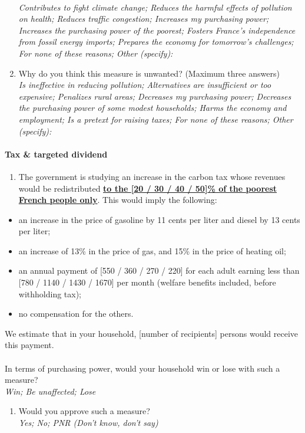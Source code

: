 \documentclass[12pt]{article} %
\begin{document}
\begin{appendices}
\begin{enumerate}[resume,leftmargin=*]
\emph{}\\
\emph{Contributes to fight climate change; Reduces the harmful 
effects of pollution on health; Reduces traffic congestion; Increases
my purchasing power; Increases the purchasing power of the poorest;
Fosters France's independence from fossil energy imports; Prepares
the economy for tomorrow's challenges; For none of these reasons;
Other (specify): }
\item Why do you think this measure is unwanted? (Maximum three answers)
\emph{}\\
\emph{Is ineffective in reducing pollution; Alternatives are insufficient
or too expensive; Penalizes rural areas; Decreases my purchasing power;
Decreases the purchasing power of some modest households; Harms the
economy and employment; Is a pretext for raising taxes; For none of
these reasons; Other (specify):} 
\end{enumerate}

\paragraph{Tax \& targeted dividend}
\begin{enumerate}[resume,leftmargin=*]
\item The government is studying an increase in the carbon tax whose revenues
would be redistributed \textbf{\underline{to the {[}20 / 30 / 40 /
50{]}\% of the poorest French people only}}. This would imply the following: 
\end{enumerate}
\begin{itemize}
\item an increase in the price of gasoline by 11 cents per liter and diesel
by 13 cents per liter; 
\item an increase of 13\% in the price of gas, and 15\% in the price of
heating oil; 
\item an annual payment of {[}550 / 360 / 270 / 220{]}\euros{} for each adult earning
less than {[}780 / 1140 / 1430 / 1670{]}\euros{} per month (welfare benefits
included, before withholding tax); 
\item no compensation for the others. 
\end{itemize}
We estimate that in your household, {[}number of recipients{]} persons
would receive this payment. \\
\\
In terms of purchasing power, would your household win or lose with
such a measure? \emph{}\\
\emph{Win; Be unaffected; Lose}
\begin{enumerate}[resume,leftmargin=*]
\item Would you approve such a measure? \emph{}\\
\emph{Yes; No; PNR (Don't know, don't say)} 
\end{enumerate}


\end{appendices}
\end{document}
